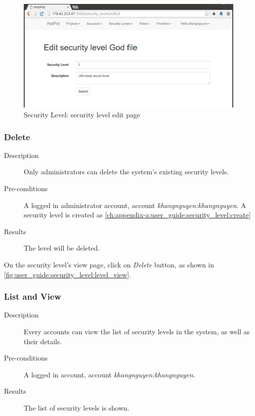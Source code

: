 \begin{figure}[bth]
\myfloatalign
\includegraphics[width=1.0\linewidth]{gfx/chapter_5/security_level/level_edit}
\caption[Security Level: security level edit page]{Security Level: security level edit page}
\label{fig:user_guide:security_level:level_edit}
\end{figure}

\subsubsection{Delete}
\label{ch:appendix-a:user_guide:security_level:delete}

\begin{description}
\item[Description] Only administrators can delete the system's existing security levels.
\item[Pre-conditions] A logged in administrator account, \eg account \emph{khangnguyen:khangnguyen}.
A security level is created as \autoref{ch:appendix-a:user_guide:security_level:create}
\item[Results] The level will be deleted.
\end{description}

On the security level's view page, click on \emph{Delete} button, as shown in \autoref{fig:user_guide:security_level:level_view}.

\subsubsection{List and View}
\label{ch:appendix-a:user_guide:security_level:list}

\begin{description}
\item[Description] Every accounts can view the list of security levels in the system, as well as their details.
\item[Pre-conditions] A logged in account, \eg account \emph{khangnguyen:khangnguyen}.
\item[Results] The list of security levels is shown.
\end{description}

